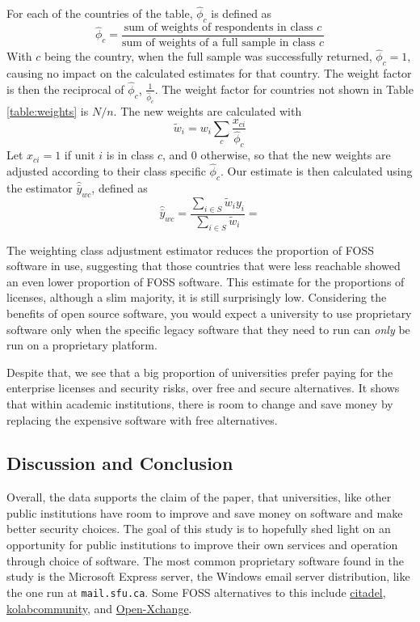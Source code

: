 \documentclass{article}
\theoremstyle{definition}
\begin{document}
\begin{flushleft}
\begin{multicols}{2}
For each of the countries of the table, $\hat{\phi}_c$ is defined as
$$
\hat{\phi}_c
=
\frac{
\textrm{sum of weights of respondents in class $c$}
}{
\textrm{sum of weights of a full sample in class $c$}
}
$$
With $c$ being the country, when the full sample was successfully returned,
$\hat{\phi}_c=1$, causing no impact on the calculated estimates for that country.
The weight factor is then the reciprocal of $\hat{\phi}_c$, $\frac{1}{\hat{\phi}_c}$.
The weight factor for countries not shown in Table \ref{table:weights} is $N/n$.
The new weights are calculated with
$$
\tilde{w}_i
=
w_i
\sum_{c}
\frac{x_{ci}}{\hat{\phi}_c}
$$
Let $x_{ci}=1$ if unit $i$ is in class $c$, and $0$ otherwise, so that
the new weights are adjusted according to their class specific $\hat{\phi}_c$.
Our estimate is then calculated using the estimator $\hat{\bar{y}}_{wc}$,
defined as
$$
\hat{\bar{y}}_{wc}
=
\frac{
	\sum_{i \in S} \tilde{w}_iy_i
}{
	\sum_{i \in S} \tilde{w}_i
}
=
$$

The weighting class adjustment estimator reduces the proportion of FOSS software
in use, suggesting that those countries that were less reachable showed an even
lower proportion of FOSS software.
This estimate for the proportions of licenses, although a slim majority, it is still
surprisingly
low. Considering the benefits of open source software, you would expect a
university to use proprietary software only when the specific legacy software
that they need to run can \textit{only} be run on a proprietary platform.

Despite that, we see that a big proportion of universities prefer paying for the
enterprise licenses and security risks, over free and secure alternatives. It shows
that within academic institutions, there is room to change and save money by
replacing the expensive software with free alternatives.

\subsection{Discussion and Conclusion}
Overall, the data supports the claim of the paper, that universities,
like other public institutions have room to improve and save money on
software and make better security choices.
The goal of this study is to hopefully shed
light on an opportunity for public institutions to improve their own
services and operation through choice of software. The most common
proprietary software found in the study is the Microsoft Express
server, the Windows email server distribution, like the one run at
\texttt{mail.sfu.ca}. Some FOSS alternatives to this include
\href{https://www.citadel.org/}{citadel},
\href{https://kolab.org/}{kolabcommunity}, and
\href{https://www.open-xchange.com/}{Open-Xchange}.


\end{multicols}
\end{flushleft}
\end{document}
